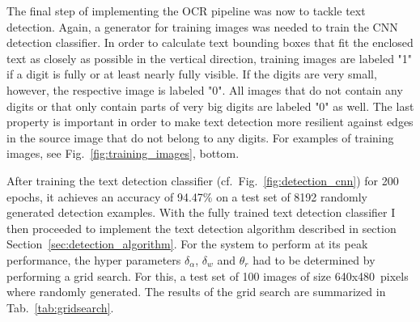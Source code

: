 \documentclass[12pt]{article}
\newcommand\figref[1]{Fig.~\ref{fig:#1}}
\newcommand\secref[1]{Section~\ref{sec:#1}}
\begin{document}
The final step of implementing the OCR pipeline was now to tackle text detection.
Again, a generator for training images was needed to train the CNN detection classifier.
In order to calculate text bounding boxes that fit the enclosed text as closely as possible
in the vertical direction, training images are labeled "1" if a digit is fully or at least
nearly fully visible. If the digits are very small, however, the respective image is labeled
"0". All images that do not contain any digits or that only contain parts of very big digits
are labeled "0" as well. The last property is important in order to make text detection
more resilient against edges in the source image that do not belong to any digits.
For examples of training images, see \figref{training_images}, bottom.

After training the text detection classifier (cf.~\figref{detection_cnn}) for 200 epochs,
it achieves an accuracy of 94.47\% on a test set of 8192 randomly generated detection examples.
With the fully trained text detection classifier I then proceeded to implement the
text detection algorithm described in section \secref{detection_algorithm}. For the system
to perform at its peak performance, the hyper parameters $\delta_\alpha$, $\delta_w$ and $\theta_r$
had to be determined by performing a grid search. For this, a test set of 100 images of size 640x480~pixels
where randomly generated. The results of the grid search are summarized in Tab.~\ref{tab:gridsearch}.
\end{document}

